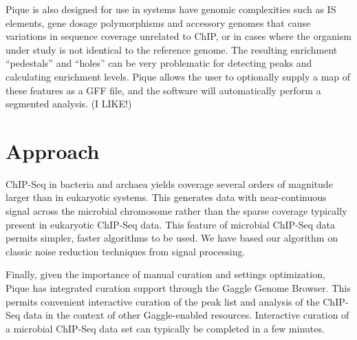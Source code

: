 \documentclass{bioinfo} %
\begin{document}
Pique is also designed for use in systems have genomic complexities such
as IS elements, gene dosage polymorphisms and accessory genomes that
cause variations in sequence coverage unrelated to ChIP, or in cases
where the organism under study is not identical to the reference genome.
The resulting enrichment ``pedestals'' and ``holes'' can be very
problematic for detecting peaks and calculating enrichment levels. Pique
allows the user to optionally supply a map of these features as a GFF
file, and the software will automatically perform a segmented analysis.
(I LIKE!)

\section{Approach}

\noindent ChIP-Seq in bacteria and archaea yields coverage several
orders of magnitude larger than in eukaryotic systems.  This generates
data with near-continuous signal across the microbial chromosome rather
than the sparse coverage typically present in eukaryotic ChIP-Seq data.
This feature of microbial ChIP-Seq data permits simpler, faster
algorithms to be used. We have based our algorithm on classic noise
reduction techniques from signal processing.

Finally, given the importance of manual curation and settings
optimization, Pique has integrated curation support through the Gaggle
Genome Browser. This permits convenient interactive curation of the peak
list and analysis of the ChIP-Seq data in the context of other
Gaggle-enabled resources. Interactive curation of a microbial ChIP-Seq
data set can typically be completed in a few minutes.
\end{document}
